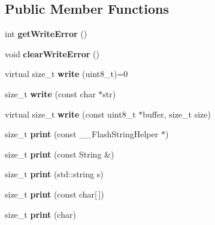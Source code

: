 \subsection*{Public Member Functions}
\begin{DoxyCompactItemize}
\item 
\mbox{\label{classPrint_a88a4a829fb5d589efb43955ad0cbddcc}} 
int {\bfseries get\+Write\+Error} ()
\item 
\mbox{\label{classPrint_aec9ecf84cc6d9087a650def3cefc459e}} 
void {\bfseries clear\+Write\+Error} ()
\item 
\mbox{\label{classPrint_a5be30d49adae2406a270c29ba9a3e0a3}} 
virtual size\+\_\+t {\bfseries write} (uint8\+\_\+t)=0
\item 
\mbox{\label{classPrint_a5b40e0e9cab1f2fe5bb0cb22ffe5adda}} 
size\+\_\+t {\bfseries write} (const char $\ast$str)
\item 
\mbox{\label{classPrint_ad98d820df11e2697be1e4b1ea30b4a23}} 
virtual size\+\_\+t {\bfseries write} (const uint8\+\_\+t $\ast$buffer, size\+\_\+t size)
\item 
\mbox{\label{classPrint_aa4158dd94bc1741f92d99c427261d7c0}} 
size\+\_\+t {\bfseries print} (const \+\_\+\+\_\+\+Flash\+String\+Helper $\ast$)
\item 
\mbox{\label{classPrint_a157007ca7ea8334ba7eb4bc705740216}} 
size\+\_\+t {\bfseries print} (const String \&)
\item 
\mbox{\label{classPrint_ada9613e75932c205c28b363eece08bc5}} 
size\+\_\+t {\bfseries print} (std\+::string s)
\item 
\mbox{\label{classPrint_acfe80773011eb17dfb52c2fba517a093}} 
size\+\_\+t {\bfseries print} (const char\mbox{[}$\,$\mbox{]})
\item 
\mbox{\label{classPrint_a1e411d07a8ffec5faf7ce485bac0f029}} 
size\+\_\+t {\bfseries print} (char)
\item 
\mbox{\label{classPrint_a97bd44df9222fa4a51a1266fab8d3bc1}} 

\end{DoxyCompactItemize}
